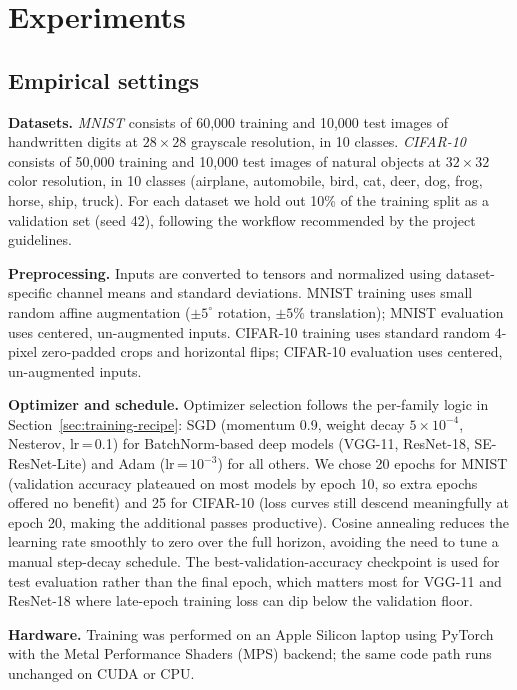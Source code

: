 \documentclass[conference,10pt]{IEEEtran}
\begin{document}
\section{Experiments}
\label{sec:exp}

\subsection{Empirical settings}

\noindent\textbf{Datasets.} \emph{MNIST} consists of 60{,}000 training
and 10{,}000 test images of handwritten digits at $28\!\times\!28$
grayscale resolution, in 10 classes. \emph{CIFAR-10} consists of
50{,}000 training and 10{,}000 test images of natural objects at
$32\!\times\!32$ color resolution, in 10 classes (airplane,
automobile, bird, cat, deer, dog, frog, horse, ship, truck). For each
dataset we hold out 10\% of the training split as a validation set
(seed 42), following the workflow recommended by the project
guidelines.

\noindent\textbf{Preprocessing.} Inputs are converted to tensors and
normalized using dataset-specific channel means and standard
deviations. MNIST training uses small random affine augmentation
($\pm 5^{\circ}$ rotation, $\pm 5\%$ translation); MNIST evaluation
uses centered, un-augmented inputs. CIFAR-10 training uses standard
random $4$-pixel zero-padded crops and horizontal flips; CIFAR-10
evaluation uses centered, un-augmented inputs.

\noindent\textbf{Optimizer and schedule.}
Optimizer selection follows the per-family logic in
Section~\ref{sec:training-recipe}: SGD (momentum 0.9, weight decay
$5\!\times\!10^{-4}$, Nesterov, lr\,=\,0.1) for BatchNorm-based deep
models (VGG-11, ResNet-18, SE-ResNet-Lite) and Adam (lr\,=\,$10^{-3}$)
for all others. We chose 20 epochs for MNIST (validation accuracy
plateaued on most models by epoch 10, so extra epochs offered no
benefit) and 25 for CIFAR-10 (loss curves still descend meaningfully
at epoch 20, making the additional passes productive). Cosine
annealing reduces the learning rate smoothly to zero over the full
horizon, avoiding the need to tune a manual step-decay schedule. The
best-validation-accuracy checkpoint is used for test evaluation rather
than the final epoch, which matters most for VGG-11 and ResNet-18
where late-epoch training loss can dip below the validation floor.

\noindent\textbf{Hardware.} Training was performed on an Apple Silicon
laptop using PyTorch~\cite{paszke2019pytorch} with the Metal
Performance Shaders (MPS) backend; the same code path runs unchanged
on CUDA or CPU.
\end{document}
